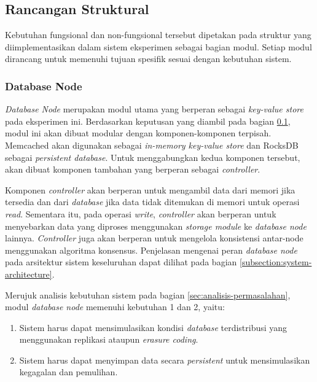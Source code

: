 \subsection{Rancangan Struktural}
\label{subsection:rancangan-struktural}

Kebutuhan fungsional dan non-fungsional tersebut dipetakan pada struktur yang diimplementasikan dalam sistem eksperimen sebagai bagian modul. Setiap modul dirancang untuk memenuhi tujuan spesifik sesuai dengan kebutuhan sistem.

\subsubsection{Database Node}
\label{subsubsection:database-node}

\textit{Database Node} merupakan modul utama yang berperan sebagai \textit{key-value store} pada eksperimen ini. Berdasarkan keputusan yang diambil pada bagian \ref{subsection:rancangan-struktural}, modul ini akan dibuat modular dengan komponen-komponen terpisah. Memcached akan digunakan sebagai \textit{in-memory key-value store} dan RocksDB sebagai \textit{persistent database}. Untuk menggabungkan kedua komponen tersebut, akan dibuat komponen tambahan yang berperan sebagai \textit{controller}.

Komponen \textit{controller} akan berperan untuk mengambil data dari memori jika tersedia dan dari \textit{database} jika data tidak ditemukan di memori untuk operasi \textit{read}. Sementara itu, pada operasi \textit{write}, \textit{controller} akan berperan untuk menyebarkan data yang diproses menggunakan \textit{storage module} ke \textit{database node} lainnya. \textit{Controller} juga akan berperan untuk mengelola konsistensi antar-node menggunakan algoritma konsensus. Penjelasan mengenai peran \textit{database node} pada arsitektur sistem keseluruhan dapat dilihat pada bagian \ref{subsection:system-architecture}.

Merujuk analisis kebutuhan sistem pada bagian \ref{sec:analisis-permasalahan}, modul \textit{database node} memenuhi kebutuhan 1 dan 2, yaitu:

\begin{enumerate}
    \item Sistem harus dapat mensimulasikan kondisi \textit{database} terdistribusi yang menggunakan replikasi ataupun \textit{erasure coding}.
    \item Sistem harus dapat menyimpan data secara \textit{persistent} untuk mensimulasikan kegagalan dan pemulihan.
\end{enumerate}

